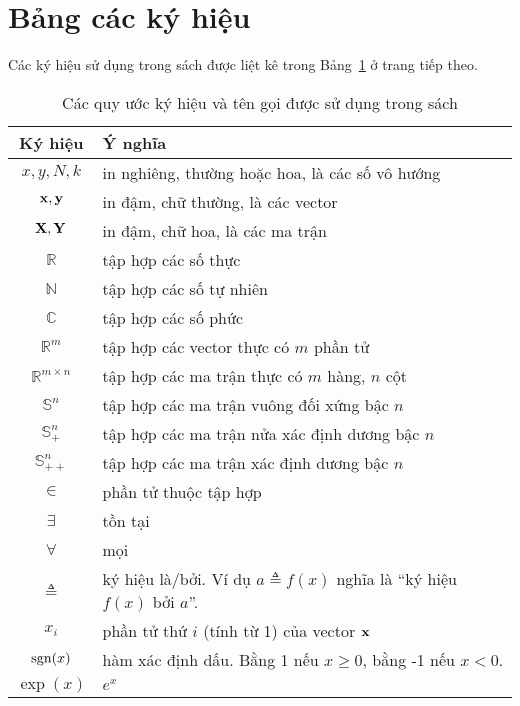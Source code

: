 
\def\R{\mathbb{R}}
\section{Bảng các ký hiệu}
Các ký hiệu sử dụng trong sách được liệt kê trong Bảng~\ref{tab:notation} ở trang tiếp theo. 

\begin{table}[h]
    \caption{Các quy ước ký hiệu và tên gọi được sử dụng trong sách}
    \label{tab:notation}
    \centering
    \begin{tabular}{|c|l|}
    \hline 
    Ký hiệu & Ý nghĩa  \\ \hline 
    \hline 
    $x, y, N, k$ & in nghiêng, thường hoặc hoa, là các số vô hướng \\ \hline
    $\mathbf{x}, \mathbf{y}$ & in đậm, chữ thường, là các vector  \\ \hline
    $\mathbf{X}, \mathbf{Y}$ & in đậm, chữ hoa, là các ma trận  \\ \hline
    $\R$ & tập hợp các số thực \\ \hline 
    $\mathbb{N}$ & tập hợp các số tự nhiên \\ \hline 
    $\mathbb{C}$ & tập hợp các số phức \\ \hline 
    $\R^{m}$ & tập hợp các vector thực có $m$ phần tử \\ \hline 
    $\R^{m\times n}$ &tập hợp các ma trận thực có $m$ hàng, $n$ cột \\ \hline
    $\mathbb{S}^n$ & tập hợp các ma trận vuông đối xứng bậc $n$ \\ \hline 
    $\mathbb{S}^n_{+}$ & tập hợp các ma trận nửa xác định dương bậc $n$ \\
    \hline 
    $\mathbb{S}^n_{++}$ & tập hợp các ma trận xác định dương bậc $n$ \\ \hline 
    $ \in $ & phần tử thuộc tập hợp \\ \hline 
    $ \exists $ & tồn tại \\ \hline 
    $ \forall $ & mọi \\ \hline 
    $ \triangleq$ & ký hiệu là/bởi. Ví dụ $a\triangleq f(x)$ nghĩa là ``ký hiệu
    $f(x)$ bởi $a$''. \\ \hline 
    $x_i$ & phần tử thứ $i$ (tính từ 1) của vector $\mathbf{x}$ \\ \hline 
    $\text{sgn}(x)$ & hàm xác định dấu. Bằng 1 nếu $x \geq 0$, bằng -1 nếu $x < 0$. \\ \hline
    $\exp(x)$ & $e^x$ \\ \hline

\end{tabular}
\end{table}
